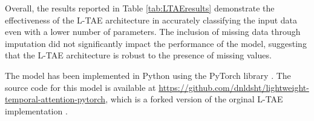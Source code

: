 Overall, the results reported in Table \ref{tab:LTAEresults} demonstrate the effectiveness of the L-TAE architecture in accurately classifying the input data even with a lower number of parameters. 
The inclusion of missing data through imputation did not significantly impact the performance of the model, suggesting that the L-TAE architecture is robust to the presence of missing values.

The model has been implemented in Python using the PyTorch library \cite{NEURIPS2019_9015}.
The source code for this model is available at \url{https://github.com/dnldsht/lightweight-temporal-attention-pytorch}, which is a forked version of the orginal L-TAE implementation \cite{LTAE}.